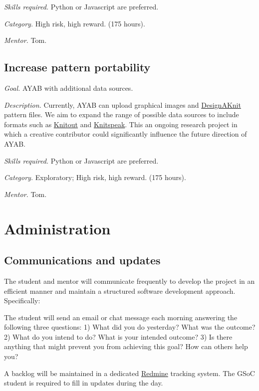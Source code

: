 \documentclass{article}
\begin{document}
\textit{Skills required.} Python or Javascript are preferred.

\textit{Category.} High risk, high reward. (175 hours). 

\textit{Mentor.} Tom.


\subsection{Increase pattern portability} 

\textit{Goal.} AYAB with additional data sources.

\textit{Description.} Currently, AYAB can upload graphical images and \href{https://www.softbyte.co.uk/designaknit9.htm}{DesignAKnit} pattern files. We aim to expand the range of possible data sources to include formats such as \href{https://textiles-lab.github.io/knitout/knitout.html}{Knitout} and \href{https://stitch-maps.com/about/knitspeak/}{Knitspeak}. This an ongoing research project in which a creative contributor could significantly influence the future direction of AYAB.

\textit{Skills required.} Python or Javascript are preferred.

\textit{Category.} Exploratory; High risk, high reward. (175 hours). 

\textit{Mentor.} Tom.


\section{Administration}

\subsection{Communications and updates}

The student and mentor will communicate frequently to develop the project in an efficient manner and
maintain a structured software development approach. Specifically:

The student will send an email or chat message each morning answering the following three questions:
1) What did you do yesterday? What was the outcome?
2) What do you intend to do? What is your intended outcome?
3) Is there anything that might prevent you from achieving this goal? How can others help
you?

A backlog will be maintained in a dedicated \href{http://www.redmine.org/}{Redmine} tracking system. The GSoC student is
required to fill in updates during the day.
\end{document}
